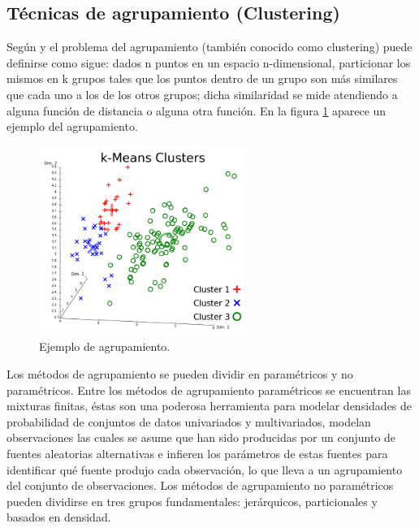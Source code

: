 \subsection {Técnicas de agrupamiento (Clustering)}  
Según \cite{[PASPLASA]} y \cite{[PASPLASA2]} el problema del agrupamiento (también conocido como clustering) puede definirse como sigue: dados n puntos en un espacio n-dimensional, particionar los mismos en k grupos tales que los puntos dentro de un grupo son más similares que cada uno a los de los otros grupos; dicha similaridad se mide atendiendo a alguna función de distancia o alguna otra función. En la figura \ref{fig:Cap2_3_2_1} aparece un ejemplo del agrupamiento.\\

    \begin{figure}[hbtp]
        \centering
            \includegraphics[width=0.6\textwidth]{MarcoTeorico/Imagenes/imagencluster.png}
            \caption{Ejemplo de agrupamiento.}                       
            \label{fig:Cap2_3_2_1}
    \end{figure} 
    
\hspace*{1cm}Los métodos de agrupamiento se pueden dividir en paramétricos y no paramétricos. Entre los métodos de agrupamiento paramétricos se encuentran las mixturas finitas, éstas son una poderosa herramienta para modelar densidades de probabilidad de conjuntos de datos univariados y multivariados, modelan observaciones las cuales se asume que han sido producidas por un conjunto de fuentes aleatorias alternativas e infieren los parámetros de estas fuentes para identificar qué fuente produjo cada observación, lo que lleva a un agrupamiento del conjunto de observaciones. Los métodos de agrupamiento no paramétricos pueden dividirse en tres grupos fundamentales: jerárquicos, particionales y basados en densidad.

